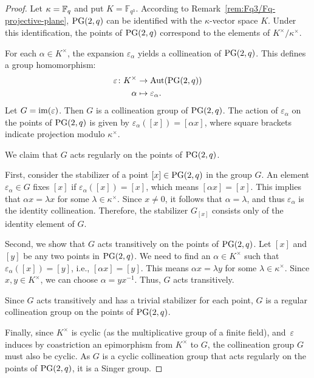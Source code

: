 \begin{proof}
    Let $\kappa=\mathbb{F}_{q}$ and put $K=\mathbb{F}_{q^3}$. According to Remark~\ref{rem:Fq3/Fq-projective-plane}, $\operatorname{PG}(2,q)$ can be identified with the $\kappa$-vector space $K$. Under this identification, the points of $\operatorname{PG}(2,q)$ correspond to the elements of $K^\times/\kappa^\times$.

    For each $\alpha \in K^\times$, the expansion $\varepsilon_\alpha$ yields a collineation of $\operatorname{PG}(2,q)$. This defines a group homomorphism:
    \begin{align*}
        \varepsilon\colon K^\times&\to\operatorname{Aut}(\operatorname{PG}(2,q))\\
        \alpha&\mapsto\varepsilon_\alpha.
    \end{align*}
    Let $G=\operatorname{im}(\varepsilon)$. Then $G$ is a collineation group of $\operatorname{PG}(2,q)$. The action of $\varepsilon_\alpha$ on the points of $\operatorname{PG}(2,q)$ is given by $\varepsilon_\alpha([x])=[\alpha x]$, where square brackets indicate projection modulo $\kappa^\times$.
    
    We claim that $G$ acts regularly on the points of $\operatorname{PG}(2,q)$.
    
    First, consider the stabilizer of a point $[x] \in \operatorname{PG}(2,q)$ in the group $G$. An element $\varepsilon_\alpha \in G$ fixes $[x]$ if $\varepsilon_\alpha([x])=[x]$, which means $[\alpha x]=[x]$. This implies that $\alpha x = \lambda x$ for some $\lambda \in \kappa^\times$. Since $x \ne 0$, it follows that $\alpha = \lambda$, and thus $\varepsilon_\alpha$ is the identity collineation. Therefore, the stabilizer $G_{[x]}$ consists only of the identity element of $G$.
    
    Second, we show that $G$ acts transitively on the points of $\operatorname{PG}(2,q)$. Let $[x]$ and $[y]$ be any two points in $\operatorname{PG}(2,q)$. We need to find an $\alpha \in K^\times$ such that $\varepsilon_\alpha([x])=[y]$, i.e., $[\alpha x]=[y]$. This means $\alpha x = \lambda y$ for some $\lambda \in \kappa^\times$. Since $x,y \in K^\times$, we can choose $\alpha = y x^{-1}$. Thus, $G$ acts transitively.
    
    Since $G$ acts transitively and has a trivial stabilizer for each point, $G$ is a regular collineation group on the points of $\operatorname{PG}(2,q)$.
    
    Finally, since $K^\times$ is cyclic (as the multiplicative group of a finite field), and~$\varepsilon$ induces by coastriction an epimorphism from $K^\times$ to $G$, the collineation group $G$ must also be cyclic. As $G$ is a cyclic collineation group that acts regularly on the points of $\operatorname{PG}(2,q)$, it is a Singer group.


\end{proof}
